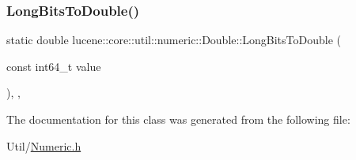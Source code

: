 \subsubsection{\texorpdfstring{Long\+Bits\+To\+Double()}{LongBitsToDouble()}}
{\footnotesize\ttfamily static double lucene\+::core\+::util\+::numeric\+::\+Double\+::\+Long\+Bits\+To\+Double (\begin{DoxyParamCaption}\item[{const int64\+\_\+t}]{value }\end{DoxyParamCaption})\hspace{0.3cm}{\ttfamily [inline]}, {\ttfamily [static]}, {\ttfamily [noexcept]}}



The documentation for this class was generated from the following file\+:\begin{DoxyCompactItemize}
\item 
Util/\mbox{\hyperlink{Numeric_8h}{Numeric.\+h}}\end{DoxyCompactItemize}
